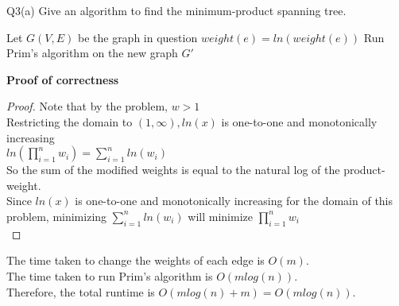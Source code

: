 \begin{problem}
  {Q3(a)}
  Give an algorithm to find the minimum-product spanning tree.
  \begin{algorithmic}[1]
    \STATE Let $G(V,E)$ be the graph in question
    \STATE $weight(e) = ln(weight(e))$
    \ENDFOR
    \STATE Run Prim's algorithm on the new graph $G'$
  \end{algorithmic}
  \textbf{Proof of correctness}
  \begin{proof}
    Note that by the problem, $w > 1$ \\
    Restricting the domain to $(1, \infty), ln(x)$ is one-to-one and monotonically increasing \\
    $ln(\prod_{i = 1}^{n}w_i) = \sum_{i = 1}^{n}ln(w_i)$ \\
    So the sum of the modified weights is equal to the natural log of the product-weight. \\
    Since $ln(x)$ is one-to-one and monotonically increasing for the domain of this problem, minimizing $\sum_{i = 1}^{n}ln(w_i)$ will minimize $\prod_{i = 1}^{n}w_i$ \\
  \end{proof}
  The time taken to change the weights of each edge is $O(m)$. \\
  The time taken to run Prim's algorithm is $O(mlog(n))$. \\
  Therefore, the total runtime is $O(mlog(n) + m) = O(mlog(n))$. \\
\end{problem}
